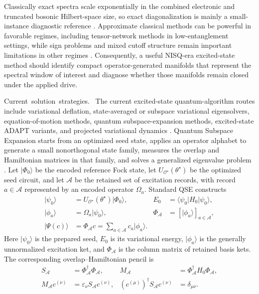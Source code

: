 \documentclass[
  reprint,
  amsmath,
  amssymb,
  aps,
  pra,
  nofootinbib,
  superscriptaddress,
  floatfix
]{revtex4-2}
\newcommand{\tentative}[1]{\textcolor{red!70!black}{#1}}
\newcommand{\structlabel}[1]{\noindent\mbox{\tentative{#1.}}~}
\newcommand{\Oset}{\mathcal{O}}
\newcommand{\Acal}{\mathcal{A}}
\newcommand{\ket}[1]{|#1\rangle}
\newcommand{\bra}[1]{\langle #1|}
\begin{document}
Classically exact spectra scale exponentially in the combined electronic and truncated bosonic Hilbert-space size, so exact diagonalization is mainly a small-instance diagnostic reference \cite{WeisseFehske2008}.  Approximate classical methods can be powerful in favorable regimes, including tensor-network methods in low-entanglement settings, while sign problems and mixed cutoff structure remain important limitations in other regimes \cite{TroyerWiese2005,Schollwoeck2011}.  Consequently, a useful NISQ-era excited-state method should identify compact operator-generated manifolds that represent the spectral window of interest and diagnose whether those manifolds remain closed under the applied drive.

\structlabel{Current solution strategies}
The current excited-state quantum-algorithm routes include variational deflation, state-averaged or subspace variational eigensolvers, equation-of-motion methods, quantum subspace-expansion methods, excited-state ADAPT variants, and projected variational dynamics \cite{Higgott2019VQD,Parrish2019MCVQE,Jones2019Spectra,Nakanishi2019SSVQE,Ollitrault2020qEOM,AsthanaKumar2023QScEOM,Yordanov2021QEB}.  Quantum Subspace Expansion starts from an optimized seed state, applies an operator alphabet to generate a small nonorthogonal state family, measures the overlap and Hamiltonian matrices in that family, and solves a generalized eigenvalue problem \cite{McClean2017QSE,Colless2018QSE}.  Let \(\ket{\Phi_0}\) be the encoded reference Fock state, let \(U_{\Oset^\star}(\theta^\star)\) be the optimized seed circuit, and let \(\Acal\) be the retained set of excitation records, with record \(a\in\Acal\) represented by an encoded operator \(\Omega_a\).  Standard QSE constructs
\begin{equation}
\begin{aligned}
\ket{\psi_0}
&=U_{\Oset^\star}(\theta^\star)\ket{\Phi_0},
&
E_0&=\bra{\psi_0}H_0\ket{\psi_0},\\
\ket{\phi_a}
&=\Omega_a\ket{\psi_0},
&
\Phi_\Acal&=[\ket{\phi_a}]_{a\in\Acal},\\
\ket{\Psi(c)}
&=\Phi_\Acal c
=\sum_{a\in\Acal}c_a\ket{\phi_a}.
\end{aligned}
\label{eq:intro_qse_basis}
\end{equation}
Here \(\ket{\psi_0}\) is the prepared seed, \(E_0\) is its variational energy, \(\ket{\phi_a}\) is the generally unnormalized excitation ket, and \(\Phi_\Acal\) is the column matrix of retained basis kets.  The corresponding overlap--Hamiltonian pencil is
\begin{align}
S_\Acal&=\Phi_\Acal^\dagger\Phi_\Acal,
&
M_\Acal&=\Phi_\Acal^\dagger H_0\Phi_\Acal,
\nonumber\\
M_\Acal c^{(\nu)}&=\varepsilon_\nu S_\Acal c^{(\nu)},
&
(c^{(\mu)})^\dagger S_\Acal c^{(\nu)}&=\delta_{\mu\nu}.
\label{eq:intro_qse_gep}
\end{align}
\end{document}
